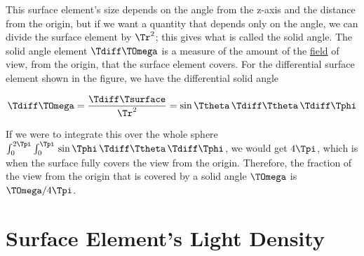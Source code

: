 This surface element's size depends on the angle from the z-axis and the distance from the origin, but if we want a quantity that depends only on the angle, we can divide the surface element by $\Tr ^2$; this gives what is called the solid angle.
The solid angle element $\Tdiff \TOmega $ is a measure of the amount of the \hyperlink{def-field}{field} of view, from the origin, that the surface element covers.
For the differential surface element shown in the figure, we have the differential solid angle

\begin{equation}
	\label{eq: solid angle}
	\Tdiff \TOmega  = \frac{\Tdiff \Tsurface }{\Tr ^2} = \sin\Ttheta  \,\Tdiff \Ttheta  \,\Tdiff \Tphi
\end{equation}

If we were to integrate this over the whole sphere $ \int_{0}^{2\Tpi } \int_{0}^{\Tpi } \, \sin \Tphi  \, \Tdiff \Ttheta  \, \Tdiff \Tphi $, we would get $4\Tpi $, which is when the surface fully covers the view from the origin.
Therefore, the fraction of the view from the origin that is covered by a solid angle $\TOmega $ is $\TOmega / 4\Tpi $.



\section{Surface Element's Light Density}\label{sect: Angular Density of Light from a Point Source}

